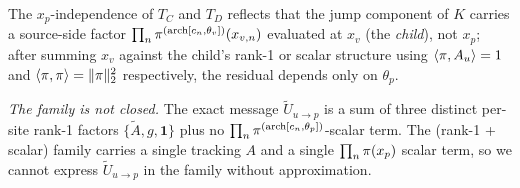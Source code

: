 The $x_p$-independence of $T_C$ and $T_D$ reflects that the jump
component of $K$ carries a source-side factor $\prod_n
\pi^{(\mathrm{arch}[c_n, \theta_v])}(x_{v, n})$ evaluated at $x_v$ (the
\emph{child}), not $x_p$; after summing $x_v$ against the child's
rank-1 or scalar structure using $\langle \pi, A_u \rangle = 1$ and
$\langle \pi, \pi \rangle = \|\pi\|_2^2$ respectively, the residual
depends only on $\theta_p$.

\emph{The family is not closed.} The exact message
$\widetilde U_{u \to p}$ is a sum of three distinct per-site rank-1
factors $\{\widetilde A, g, \mathbf{1}\}$ plus no
$\prod_n \pi^{(\mathrm{arch}[c_n, \theta_p])}$-scalar term. The
(rank-1 + scalar) family carries a single tracking $A$ and a single
$\prod_n \pi(x_p)$ scalar term, so we cannot express
$\widetilde U_{u \to p}$ in the family without approximation.

